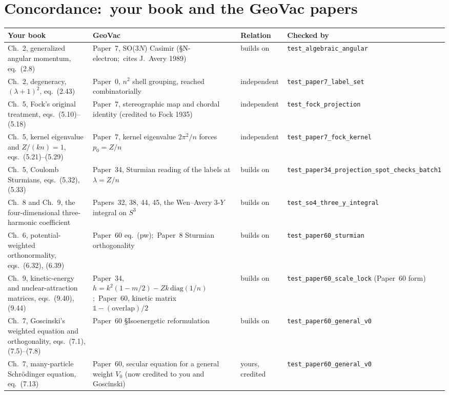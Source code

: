 \documentclass[11pt]{article}
\newcommand{\tst}[1]{\nolinkurl{#1}}
\begin{document}
\section{Concordance:\ your book and the GeoVac papers}
{\small
\renewcommand{\arraystretch}{1.15}
\begin{longtable}{>{\raggedright\arraybackslash}p{}>{\raggedright\arraybackslash}p{}>{\raggedright\arraybackslash}p{}>{\raggedright\arraybackslash}p{}}
\toprule
Your book & GeoVac & Relation & Checked by\\
\midrule
\endhead
Ch.~2, generalized angular momentum, eq.~(2.8) & Paper~7, SO($3N$) Casimir (\S N-electron;\ cites J.~Avery 1989) & builds on & \tst{test_algebraic_angular}\\
Ch.~2, degeneracy, $(\lambda+1)^2$, eq.~(2.43) & Paper~0, $n^2$ shell grouping, reached combinatorially & independent & \tst{test_paper7_label_set}\\
Ch.~5, Fock's original treatment, eqs.~(5.10)--(5.18) & Paper~7, stereographic map and chordal identity (credited to Fock 1935) & independent & \tst{test_fock_projection}\\
Ch.~5, kernel eigenvalue and $Z/(kn)=1$, eqs.~(5.21)--(5.29) & Paper~7, kernel eigenvalue $2\pi^2/n$ forces $p_0=Z/n$ & independent & \tst{test_paper7_fock_kernel}\\
Ch.~5, Coulomb Sturmians, eqs.~(5.32), (5.33) & Paper~34, Sturmian reading of the labels at $\lambda=Z/n$ & builds on & \tst{test_paper34_projection_spot_checks_batch1}\\
Ch.~8 and Ch.~9, the four-dimensional three-harmonic coefficient & Papers~32, 38, 44, 45, the Wen--Avery 3-$Y$ integral on $S^3$ & builds on & \tst{test_so4_three_y_integral}\\
Ch.~6, potential-weighted orthonormality, eqs.~(6.32), (6.39) & Paper~60 eq.~(pw);\ Paper~8 Sturmian orthogonality & builds on & \tst{test_paper60_sturmian}\\
Ch.~9, kinetic-energy and nuclear-attraction matrices, eqs.~(9.40), (9.44) & Paper~34, $h=k^2(1-m/2)-Zk\,\mathrm{diag}(1/n)$;\ Paper~60, kinetic matrix $\mathbb{1}-(\text{overlap})/2$ & builds on & \tst{test_paper60_scale_lock} (Paper~60 form)\\
Ch.~7, Goscinski's weighted equation and orthogonality, eqs.~(7.1), (7.5)--(7.8) & Paper~60 \S Isoenergetic reformulation & builds on & \tst{test_paper60_general_v0}\\
Ch.~7, many-particle Schr\"odinger equation, eq.~(7.13) & Paper~60, secular equation for a general weight $V_0$ (now credited to you and Goscinski) & yours, credited & \tst{test_paper60_general_v0}\\

\end{longtable}}
\end{document}
